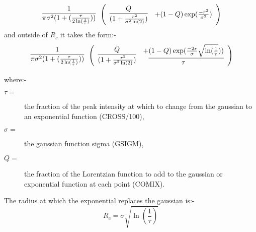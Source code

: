 \begin{displaymath}
\begin{array}{c}
 1\\
 \overline{\pi\sigma^{2}(1+(\frac{\tau}{2\ln(\frac{1}{\tau})}))}
\end{array}
    \left( \begin{array}{c} Q \\
    \overline{(1+\frac{r^{2}}{\sigma^{2}\ln(2)} )}\\
    \end{array}
      \begin{array}[b]{c}
         + (1-Q)\exp(\frac{-r^{2}}{\sigma^{2}})\\
      \end{array} \right) \\
\end{displaymath}
and outside of $R_{c}$ it takes the form:-
\begin{displaymath}
\begin{array}{c}
 1\\
 \overline{\pi\sigma^{2}(1+(\frac{\tau}{2\ln(\frac{1}{\tau})}))}
\end{array}
    \left( \begin{array}{c} Q \\
    \overline{(1+\frac{r^{2}}{\sigma^{2}\ln(2)} )}\\
    \end{array}
      \begin{array}{cc}
         +\underline{(1-Q)\exp(\frac{-2r}{\sigma}\sqrt{\ln(\frac{1}{\tau}}))}\\
          \tau\\
      \end{array} \right) \\
\end{displaymath}

where:-
\begin{description}
\item[$\tau=$] the fraction of the peak intensity at which to change
from the gaussian to an exponential function (CROSS/100),
\item[$\sigma=$] the gaussian function sigma (GSIGM),
\item[$Q=$] the fraction of the Lorentzian function to add to the
gaussian or exponential function at each point (COMIX).
\end{description}

The radius at which the exponential replaces the gaussian is:-
\begin{displaymath}
   R_{c}=\sigma\sqrt{\ln(\frac{1}{\tau})}
\end{displaymath}

